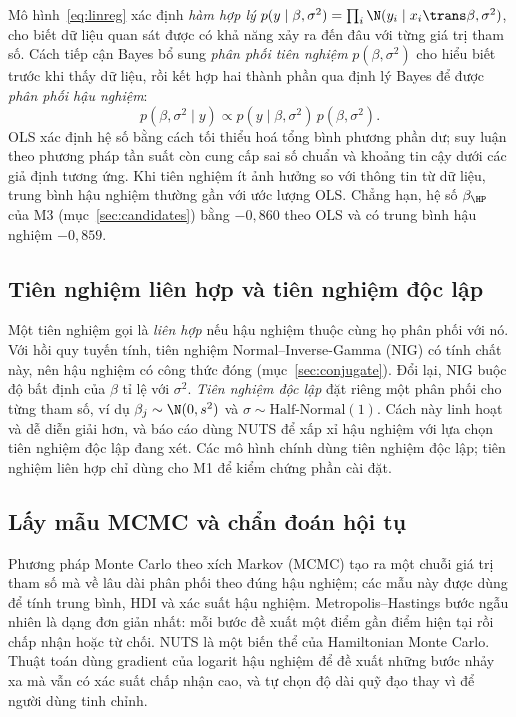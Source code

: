 \documentclass[12pt,a4paper]{report}
\begin{document}
Mô hình~\eqref{eq:linreg} xác định \emph{hàm hợp lý}
$p(y \mid \beta, \sigma^2) = \prod_i \N(y_i \mid x_i\trans \beta, \sigma^2)$,
cho biết dữ liệu quan sát được có khả năng xảy ra đến đâu với từng giá trị tham
số. Cách tiếp cận Bayes bổ sung \emph{phân phối tiên nghiệm}
$p(\beta, \sigma^2)$ cho hiểu biết trước khi thấy dữ liệu, rồi kết hợp hai thành
phần qua định lý Bayes để được \emph{phân phối hậu nghiệm}:
%
\begin{equation}
  \label{eq:bayes}
  p(\beta, \sigma^2 \mid y) \propto p(y \mid \beta, \sigma^2)\, p(\beta, \sigma^2).
\end{equation}
%
OLS xác định hệ số bằng cách tối thiểu hoá tổng bình phương phần dư; suy luận
theo phương pháp tần suất còn cung cấp sai số chuẩn và khoảng tin cậy dưới các
giả định tương ứng. Khi tiên nghiệm ít ảnh hưởng so với thông
tin từ dữ liệu, trung bình hậu nghiệm thường gần với ước lượng OLS. Chẳng hạn,
hệ số $\beta_{\HP}$ của M3 (mục~\ref{sec:candidates}) bằng $-0{,}860$ theo OLS
và có trung bình hậu nghiệm $-0{,}859$.

\subsection{Tiên nghiệm liên hợp và tiên nghiệm độc lập}

Một tiên nghiệm gọi là \emph{liên hợp} nếu hậu nghiệm thuộc cùng họ phân phối
với nó. Với hồi quy tuyến tính, tiên nghiệm Normal--Inverse-Gamma (NIG) có tính
chất này, nên hậu nghiệm có công thức đóng (mục~\ref{sec:conjugate}). Đổi lại,
NIG buộc độ bất định của $\beta$ tỉ lệ với $\sigma^2$. \emph{Tiên nghiệm độc
lập} đặt riêng một phân phối cho từng tham số, ví dụ $\beta_j \sim \N(0, s^2)$
và $\sigma \sim \text{Half-Normal}(1)$. Cách này linh hoạt và dễ diễn giải hơn,
và báo cáo dùng NUTS để xấp xỉ hậu nghiệm với lựa chọn tiên nghiệm độc lập đang
xét. Các mô hình chính dùng tiên nghiệm độc lập; tiên nghiệm liên hợp chỉ dùng
cho M1 để kiểm chứng phần cài đặt.

\subsection{Lấy mẫu MCMC và chẩn đoán hội tụ}

Phương pháp Monte Carlo theo xích Markov (MCMC) tạo ra một chuỗi giá trị tham số
mà về lâu dài phân phối theo đúng hậu nghiệm; các mẫu này được dùng để tính
trung bình, HDI và xác suất hậu nghiệm. Metropolis--Hastings bước ngẫu nhiên
\cite{hastings1970} là dạng đơn giản nhất: mỗi bước đề xuất một điểm gần điểm hiện tại rồi chấp nhận
hoặc từ chối. NUTS \cite{hoffman2014nuts} là một biến thể của Hamiltonian Monte
Carlo. Thuật toán dùng gradient của logarit hậu nghiệm để đề xuất những bước nhảy xa mà
vẫn có xác suất chấp nhận cao, và tự chọn độ dài quỹ đạo thay vì để người dùng
tinh chỉnh.
\end{document}
